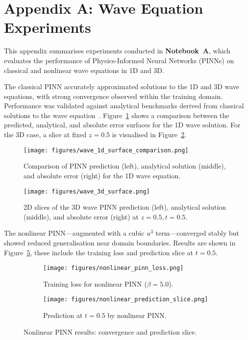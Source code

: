 \documentclass[12pt,a4paper]{article}
\begin{document}
\section*{Appendix A: Wave Equation Experiments}

This appendix summarises experiments conducted in \textbf{Notebook~A}, which evaluates the performance of Physics-Informed Neural Networks (PINNs) on classical and nonlinear wave equations in 1D and 3D.

The classical PINN accurately approximated solutions to the 1D and 3D wave equations, with strong convergence observed within the training domain. Performance was validated against analytical benchmarks derived from classical solutions to the wave equation~\cite{strauss2007partial, taylor2010partial}. Figure~\ref{fig:wave1d-surfaces} shows a comparison between the predicted, analytical, and absolute error surfaces for the 1D wave solution. For the 3D case, a slice at fixed \( z = 0.5 \) is visualised in Figure~\ref{fig:wave3d-surfaces}.

\begin{figure}[h!]
  \centering
  \texttt{[image: figures/wave\_1d\_surface\_comparison.png]}
  \caption{Comparison of PINN prediction (left), analytical solution (middle), and absolute error (right) for the 1D wave equation.}
  \label{fig:wave1d-surfaces}
\end{figure}

\begin{figure}[h!]
  \centering
  \texttt{[image: figures/wave\_3d\_surface.png]}
  \caption{2D slices of the 3D wave PINN prediction (left), analytical solution (middle), and absolute error (right) at \(z = 0.5, t = 0.5\).}
  \label{fig:wave3d-surfaces}
\end{figure}

The nonlinear PINN—augmented with a cubic \( u^3 \) term—converged stably but showed reduced generalisation near domain boundaries. Results are shown in Figure~\ref{fig:nonlinear-combined}, these include the training loss and prediction slice at \( t = 0.5 \).

\begin{figure}[h!]
  \centering
  \begin{subfigure}[t]{0.48\textwidth}
    \texttt{[image: figures/nonlinear\_pinn\_loss.png]}
    \caption{Training loss for nonlinear PINN ($\beta = 5.0$).}
    \label{fig:nonlinear-loss}
  \end{subfigure}
  \hfill
  \begin{subfigure}[t]{0.48\textwidth}
    \texttt{[image: figures/nonlinear\_prediction\_slice.png]}
    \caption{Prediction at \( t = 0.5 \) by nonlinear PINN.}
    \label{fig:nonlinear-pred}
  \end{subfigure}
  \caption{Nonlinear PINN results: convergence and prediction slice.}
  \label{fig:nonlinear-combined}
\end{figure}
\end{document}
